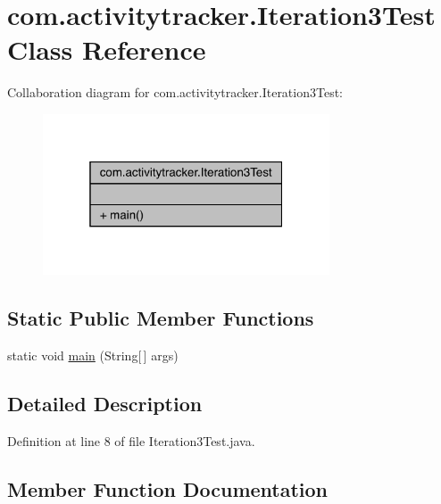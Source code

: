 \hypertarget{classcom_1_1activitytracker_1_1_iteration3_test}{}\section{com.\+activitytracker.\+Iteration3\+Test Class Reference}
\label{classcom_1_1activitytracker_1_1_iteration3_test}


Collaboration diagram for com.\+activitytracker.\+Iteration3\+Test\+:
\nopagebreak
\begin{figure}[H]
\begin{center}
\leavevmode
\includegraphics[width=241pt]{classcom_1_1activitytracker_1_1_iteration3_test__coll__graph}
\end{center}
\end{figure}
\subsection*{Static Public Member Functions}
\begin{DoxyCompactItemize}
\item 
static void \mbox{\hyperlink{classcom_1_1activitytracker_1_1_iteration3_test_a54f41d79b383667b8f79258dbfd7771c}{main}} (String\mbox{[}$\,$\mbox{]} args)
\end{DoxyCompactItemize}


\subsection{Detailed Description}


Definition at line 8 of file Iteration3\+Test.\+java.



\subsection{Member Function Documentation}
\mbox{\label{classcom_1_1activitytracker_1_1_iteration3_test_a54f41d79b383667b8f79258dbfd7771c}} 

